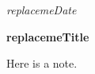 \documentclass[10pt,numbers=noenddot]{minimal}
\begin{document}
\vspace*{\fill}

\begin{flushright}\textit{replacemeDate}\end{flushright}
\textbf{replacemeTitle}

Here is a note.

\vspace*{\fill}
\end{document}
